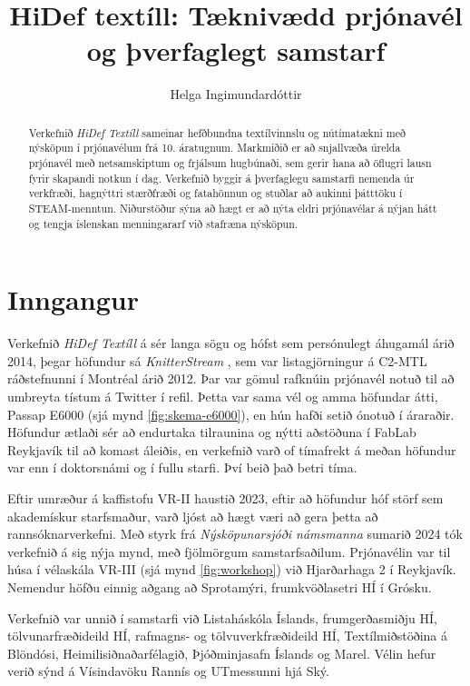 \documentclass[a4paper,10pt,twocolumn]{article}
\title{HiDef textíll: Tæknivædd prjónavél og þverfaglegt samstarf}
\author{Helga Ingimundardóttir}
\date{}
\begin{document}
\maketitle

\begin{abstract}
Verkefnið \emph{HiDef Textíll} sameinar hefðbundna textílvinnslu og nútímatækni með
nýsköpun í prjónavélum frá 10. áratugnum. Markmiðið er að snjallvæða úrelda prjónavél
með netsamskiptum og frjálsum hugbúnaði, sem gerir hana að öflugri lausn fyrir
skapandi notkun í dag. Verkefnið byggir á þverfaglegu samstarfi nemenda úr verkfræði,
hagnýttri stærðfræði og fatahönnun og stuðlar að aukinni þátttöku í STEAM-menntun.
Niðurstöður sýna að hægt er að nýta eldri prjónavélar á nýjan hátt og tengja íslenskan
menningararf við stafræna nýsköpun.
\end{abstract}

\section{Inngangur}
Verkefnið \emph{HiDef Textíll} á sér langa sögu og hófst sem persónulegt áhugamál 
árið 2014, þegar höfundur sá \emph{KnitterStream} \cite{knitterstream}, sem var 
listagjörningur á C2-MTL ráðstefnunni í Montréal árið 2012. Þar var gömul rafknúin 
prjónavél notuð til að umbreyta tístum á Twitter í refil. Þetta var sama vél og 
amma höfundar átti, Passap E6000 (sjá mynd \ref{fig:skema-e6000}), en hún hafði setið 
ónotuð í áraraðir. Höfundur ætlaði sér að endurtaka tilraunina og nýtti aðstöðuna 
í FabLab Reykjavík til að komast áleiðis, en verkefnið varð of tímafrekt á meðan 
höfundur var enn í doktorsnámi og í fullu starfi. Því beið það betri tíma.

Eftir umræður á kaffistofu VR-II haustið 2023, eftir að höfundur hóf störf sem 
akademískur starfsmaður, varð ljóst að hægt væri að gera þetta að rannsóknarverkefni. 
Með styrk frá \emph{Nýsköpunarsjóði námsmanna} sumarið 2024 tók verkefnið á sig nýja 
mynd, með fjölmörgum samstarfsaðilum. Prjónavélin var til húsa í vélaskála VR-III 
(sjá mynd \ref{fig:workshop}) við Hjarðarhaga 2 í Reykjavík. Nemendur höfðu einnig 
aðgang að Sprotamýri, frumkvöðlasetri HÍ í Grósku.

Verkefnið var unnið í samstarfi við Listaháskóla Íslands, frumgerðasmiðju HÍ, 
tölvunarfræðideild HÍ, rafmagns- og tölvuverkfræðideild HÍ, Textílmiðstöðina á 
Blöndósi, Heimilisiðnaðarfélagið, Þjóðminjasafn Íslands og Marel. Vélin hefur verið 
sýnd á Vísindavöku Rannís og UTmessunni hjá Ský.
\end{document}
